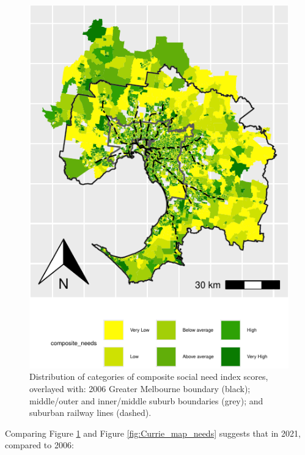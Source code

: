 \documentclass[preprint, 3p,
authoryear]{elsarticle} %
\begin{document}
\begin{figure}
\includegraphics[width=0.9\linewidth]{Leveraging_GTFS_to_assess_transit_supply_Transport_Geography_files/figure-latex/Greater_Melbourne_2021_social_needs-1} \caption{Distribution of categories of composite social need index scores, overlayed with: 2006 Greater Melbourne boundary (black); middle/outer and inner/middle suburb boundaries (grey); and suburban railway lines (dashed).}\label{fig:Greater_Melbourne_2021_social_needs}
\end{figure}

Comparing Figure \ref{fig:Greater_Melbourne_2021_social_needs} and
Figure \ref{fig:Currie_map_needs} suggests that in 2021, compared to
2006:
\end{document}
